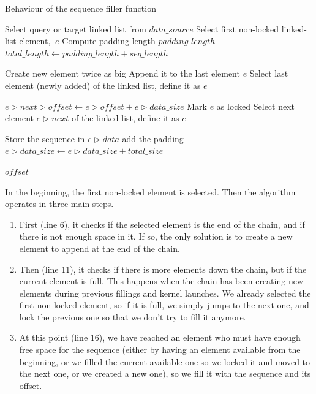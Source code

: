 \begin{algorithm}[h!]
	\caption{Behaviour of the sequence filler function}
	\label{algo:extensiblefunction}
	\begin{algorithmic}[1] %
		
		\State Select query or target linked list from $data\_source$
		\State Select first non-locked linked-list element, $~e$
		\State Compute padding length $padding\_length$
		\State $total\_length \leftarrow padding\_length + seq\_length$
		
			\State Create new element twice as big
			\State Append it to the last element $e$
			\State Select last element (newly added) of the linked list, define it as $e$
		\EndIf
		
			\State $e\rhd next\rhd offset \leftarrow e\rhd offset + e\rhd data\_size $
			\State Mark $e$ as locked
			\State Select next element $e\rhd next$ of the linked list, define it as $e$
		\EndIf
		
			\State Store the sequence in $e\rhd data$ add the padding
			\State $e\rhd data\_size \leftarrow e\rhd data\_size + total\_size$
		
		
		\Return $offset$
		\EndFunction
		
	\end{algorithmic}
\end{algorithm}

In the beginning, the first non-locked element is selected. Then the algorithm operates in three main steps. 

\begin{enumerate}
	\item First (line 6), it checks if the selected element is the end of the chain, and if there is not enough space in it. If so, the only solution is to create a new element to append at the end of the chain.
	\item Then (line 11), it checks if there is more elements down the chain, but if the current element is full. This happens when the chain has been creating new elements during previous fillings and kernel launches. We already selected the first non-locked element, so if it is full, we simply jumps to the next one, and lock the previous one so that we don't try to fill it anymore.
	\item At this point (line 16), we have reached an element who must have enough free space for the sequence (either by having an element available from the beginning, or we filled the current available one so we locked it and moved to the next one, or we created a new one), so we fill it with the sequence and its offset.
\end{enumerate}

